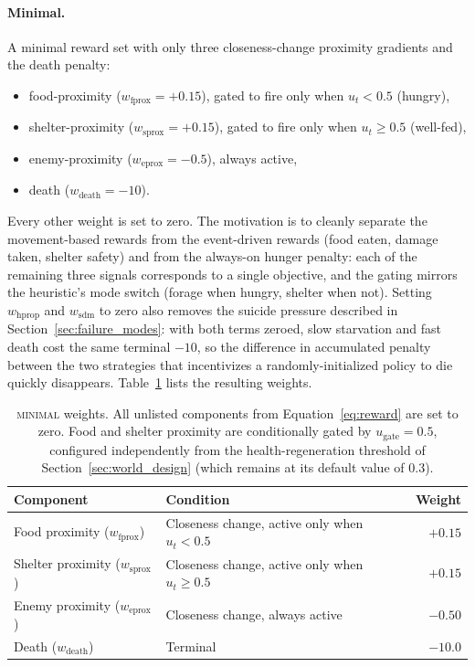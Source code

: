 \documentclass[12pt,a4paper,titlepage]{article}
\begin{document}
\paragraph{Minimal.} A minimal reward set with only three closeness-change proximity gradients and the death penalty:
\begin{itemize}[nosep,leftmargin=1.6em]
  \item food-proximity ($w_\text{fprox}=+0.15$), gated to fire only when $u_t < 0.5$ (hungry),
  \item shelter-proximity ($w_\text{sprox}=+0.15$), gated to fire only when $u_t \geq 0.5$ (well-fed),
  \item enemy-proximity ($w_\text{eprox}=-0.5$), always active,
  \item death ($w_\text{death}=-10$).
\end{itemize}
Every other weight is set to zero. The motivation is to cleanly separate the movement-based rewards from the event-driven rewards (food eaten, damage taken, shelter safety) and from the always-on hunger penalty: each of the remaining three signals corresponds to a single objective, and the gating mirrors the heuristic's mode switch (forage when hungry, shelter when not). Setting $w_\text{hprop}$ and $w_\text{sdm}$ to zero also removes the suicide pressure described in Section~\ref{sec:failure_modes}: with both terms zeroed, slow starvation and fast death cost the same terminal $-10$, so the difference in accumulated penalty between the two strategies that incentivizes a randomly-initialized policy to die quickly disappears. Table~\ref{tab:minimal_config} lists the resulting weights.

\begin{table}[!ht]
\centering
\caption{\textsc{minimal} weights. All unlisted components from Equation~\ref{eq:reward} are set to zero. Food and shelter proximity are conditionally gated by $u_\text{gate} = 0.5$, configured independently from the health-regeneration threshold of Section~\ref{sec:world_design} (which remains at its default value of $0.3$).}
\label{tab:minimal_config}
\small
\begin{tabular}{llr}
\toprule
Component & Condition & Weight \\
\midrule
Food proximity ($w_\text{fprox}$)    & Closeness change, active only when $u_t < 0.5$    & $+0.15$ \\
Shelter proximity ($w_\text{sprox}$) & Closeness change, active only when $u_t \geq 0.5$ & $+0.15$ \\
Enemy proximity ($w_\text{eprox}$)   & Closeness change, always active                   & $-0.50$ \\
Death ($w_\text{death}$)             & Terminal                                          & $-10.0$ \\
\bottomrule
\end{tabular}
\end{table}
\end{document}
